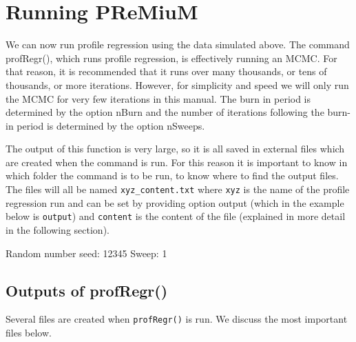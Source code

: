 \documentclass{article}
\begin{document}
\section{Running PReMiuM}
We can now run profile regression using the data simulated above. The command profRegr(), which runs profile regression, is effectively running an MCMC. For that reason, it is recommended that it runs over many thousands, or tens of thousands, or more iterations. However, for simplicity and speed we will only run the MCMC for very few iterations in this manual. The burn in period is determined by the option nBurn and the number of iterations following the burn-in period is determined by the option nSweeps. 

The output of this function is very large, so it is all saved in external files which are created when the command is run. For this reason it is important to know in which folder the command is to be run, to know where to find the output files. The files will all be named \verb|xyz_content.txt| where \verb|xyz| is the name of the profile regression run and can be set by providing option output (which in the example below is \verb|output|) and \verb|content| is the content of the file (explained in more detail in the following section).

\begin{Schunk}
\begin{Soutput}
Random number seed: 12345
Sweep: 1
\end{Soutput}
\end{Schunk}

\subsection{Outputs of profRegr()}
Several files are created when \verb|profRegr()| is run. We discuss the most important files below. 
\end{document}
